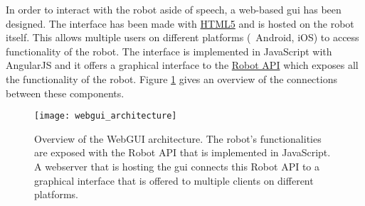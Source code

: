 In order to interact with the robot aside of speech, a web-based \gls{gui} has been designed.
The interface has been made with \href{https://github.com/tue-robotics/tue\_mobile\_ui}{HTML5} and is hosted on the robot itself.
This allows multiple users on different platforms (\eg\ Android, iOS) to access functionality of the robot. The interface is implemented in JavaScript with AngularJS and it offers a graphical interface to the \href{https://github.com/tue-robotics/robot-api}{Robot API} which exposes all the functionality of the robot.
Figure \ref{fig:webgui_architecture} gives an overview of the connections between these components.
\begin{figure}[h]
    \centering
	\texttt{[image: webgui\_architecture]}
    \vspace{-0.5em}
	\caption{
		Overview of the WebGUI architecture.
		The robot's functionalities are exposed with the Robot API that is implemented in JavaScript.
		A webserver that is hosting the \protect\gls{gui} connects this Robot API to a graphical interface that is offered to multiple clients on different platforms.}
	\label{fig:webgui_architecture}
\end{figure}
